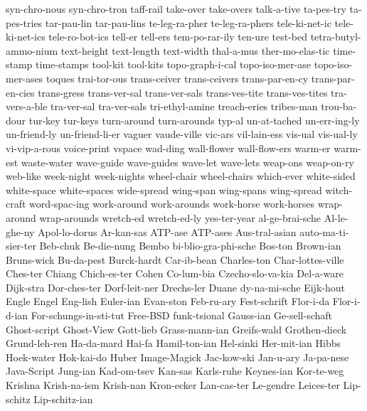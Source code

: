 {{{  syn-chro-nous
  syn-chro-tron
  taff-rail
  take-over
  take-overs
  talk-a-tive
  ta-pes-try
  ta-pes-tries
  tar-pau-lin
  tar-pau-lins
  te-leg-ra-pher
  te-leg-ra-phers
  tele-ki-net-ic
  tele-ki-net-ics
  tele-ro-bot-ics
  tell-er
  tell-ers
  tem-po-rar-ily
  ten-ure
  test-bed
  tetra-butyl-ammo-nium
  text-height
  text-length
  text-width
  thal-a-mus
  ther-mo-elas-tic
  time-stamp
  time-stamps
  tool-kit
  tool-kits
  topo-graph-i-cal
  topo-iso-mer-ase
  topo-iso-mer-ases
  toques
  trai-tor-ous
  trans-ceiver
  trans-ceivers
  trans-par-en-cy
  trans-par-en-cies
  trans-gress
  trans-ver-sal
  trans-ver-sals
  trans-ves-tite
  trans-ves-tites
  tra-vers-a-ble
  tra-ver-sal
  tra-ver-sals
  tri-ethyl-amine
  treach-eries
  tribes-man
  trou-ba-dour
  tur-key
  tur-keys
  turn-around
  turn-arounds
  typ-al
  un-at-tached
  un-err-ing-ly
  un-friend-ly
  un-friend-li-er
  vaguer
  vaude-ville
  vic-ars
  vil-lain-ess
  vis-ual
  vis-ual-ly
  vi-vip-a-rous
  voice-print
  vspace
  wad-ding
  wall-flower
  wall-flow-ers
  warm-er
  warm-est
  waste-water
  wave-guide
  wave-guides
  wave-let
  wave-lets
  weap-ons
  weap-on-ry
  web-like
  week-night
  week-nights
  wheel-chair
  wheel-chairs
  which-ever
  white-sided
  white-space
  white-spaces
  wide-spread
  wing-span
  wing-spans
  wing-spread
  witch-craft
  word-spac-ing
  work-around
  work-arounds
  work-horse
  work-horses
  wrap-around
  wrap-arounds
  wretch-ed
  wretch-ed-ly
  yes-ter-year
  al-ge-brai-sche
  Al-le-ghe-ny
  Apol-lo-dorus
  Ar-kan-sas
  ATP-ase
  ATP-ases
  Aus-tral-asian
  auto-ma-ti-sier-ter
  Beb-chuk
  Be-die-nung
  Bembo
  bi-blio-gra-phi-sche
  Bos-ton
  Brown-ian
  Bruns-wick
  Bu-da-pest
  Burck-hardt
  Car-ib-bean
  Charles-ton
  Char-lottes-ville
  Ches-ter
  Chiang
  Chich-es-ter
  Cohen
  Co-lum-bia
  Czecho-slo-va-kia
  Del-a-ware
  Dijk-stra
  Dor-ches-ter
  Dorf-leit-ner
  Drechs-ler
  Duane
  dy-na-mi-sche
  Eijk-hout
  Engle
  Engel
  Eng-lish
  Euler-ian
  Evan-ston
  Feb-ru-ary
  Fest-schrift
  Flor-i-da
  Flor-i-d-ian
  For-schungs-in-sti-tut
  Free-BSD
  funk-tsional
  Gauss-ian
  Ge-sell-schaft
  Ghost-script
  Ghost-View
  Gott-lieb
  Grass-mann-ian
  Greifs-wald
  Grothen-dieck
  Grund-leh-ren
  Ha-da-mard
  Hai-fa
  Hamil-ton-ian
  Hel-sinki
  Her-mit-ian
  Hibbs
  Hoek-water
  Hok-kai-do
  Huber
  Image-Magick
  Jac-kow-ski
  Jan-u-ary
  Ja-pa-nese
  Java-Script
  Jung-ian
  Kad-om-tsev
  Kan-sas
  Karls-ruhe
  Keynes-ian
  Kor-te-weg
  Krishna
  Krish-na-ism
  Krish-nan
  Kron-ecker
  Lan-cas-ter
  Le-gendre
  Leices-ter
  Lip-schitz
  Lip-schitz-ian
}}}
